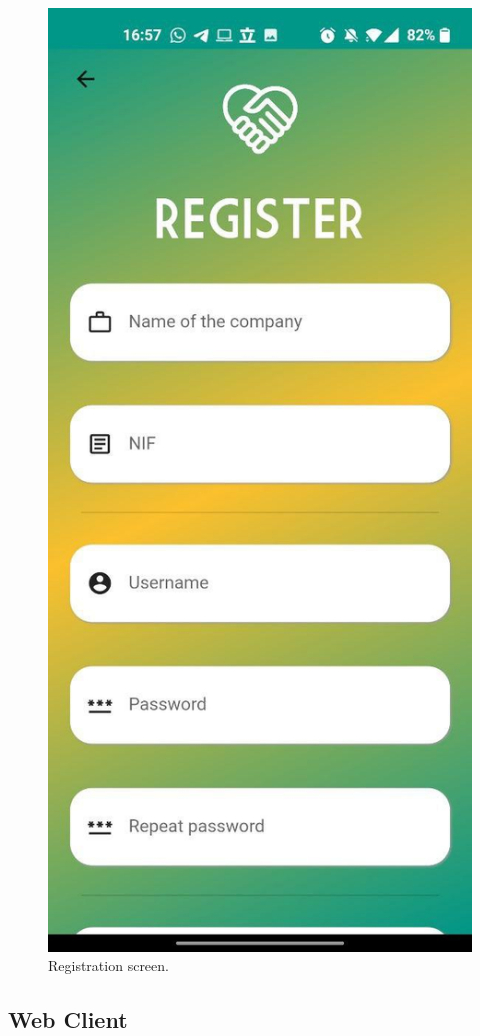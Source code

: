 \documentclass[./main.tex]{subfiles}
\begin{document}
\begin{figure}[H]
\centering
\includegraphics[width=0.5\linewidth]{img/mobile-screen-1.jpg}
\caption{Registration screen.}
\label{fig:mobile-screen-1}
\end{figure}


\subsection{Web Client}
\end{document}
